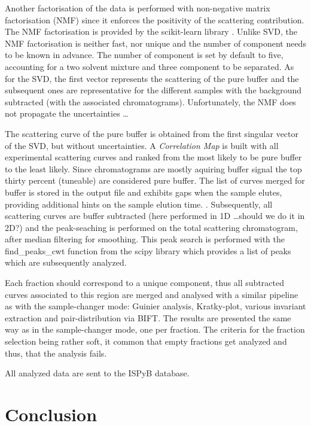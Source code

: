 \documentclass[preprint]{iucr}              %
\begin{document}
Another factorisation of the data is performed with non-negative matrix factorisation (NMF) since it enforces the positivity
of the scattering contribution. 
The NMF factorisation is provided by the scikit-learn library \cite{sklearn}.
Unlike SVD, the NMF factorisation is neither fast, nor unique and the number of component needs to be known in advance.
The number of component is set by default to five, accounting for a two solvent mixture and three component to be separated.   
As for the SVD, the first vector represents the scattering of the pure buffer and the subsequent ones 
are representative for the different samples with the background subtracted (with the associated chromatograms).
Unfortunately, the NMF does not propagate the uncertainties \ldots

The scattering curve of the pure buffer is obtained from the first singular vector of the SVD, but without uncertainties.
A \textit{Correlation Map} is built with all experimental scattering curves and ranked from the  most likely to be pure buffer
to the least likely. 
Since chromatograms are mostly aquiring buffer signal the top thirty percent (tuneable) are considered pure buffer.
The list of curves merged for buffer is stored in the output file and exhibits gaps when the sample elutes, 
providing additional hints on the sample elution time. .    
Subsequently, all scattering curves are buffer subtracted (here performed in 1D \ldots should we do it in 2D?) and the
peak-seaching is performed on the total scattering chromatogram, after median filtering for smoothing.
This peak search is performed with the find_peaks_cwt function from the scipy library \cite{scipy} which provides a
list of peaks which are subsequently analyzed.

Each fraction should correspond to a unique component, thus all subtracted curves associated to this region are merged and analysed
with a similar pipeline as with the sample-changer mode: Guinier analysis, Kratky-plot, various invariant extraction and 
pair-distribution via BIFT. 
The results are presented the same way as in the sample-changer mode, one per fraction.
The criteria for the fraction selection being rather soft, it common that empty fractions get analyzed and thus, 
that the analysis fails. 

All analyzed data are sent to the ISPyB database.     

\section{Conclusion}
\end{document}
